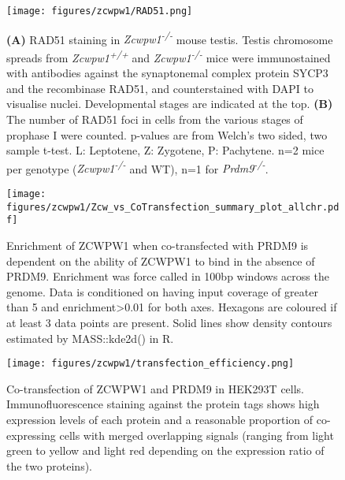 \begin{figure}[H]
	\centering
	\texttt{[image: figures/zcwpw1/RAD51.png]}
	\caption[RAD51 Counts]{
		\textbf{(A)} RAD51 staining in \textit{Zcwpw1\textsuperscript{-/-}} mouse testis. Testis chromosome spreads from \textit{Zcwpw1\textsuperscript{+/+}} and \textit{Zcwpw1\textsuperscript{-/-}} mice were immunostained with antibodies against the synaptonemal complex protein SYCP3 and the recombinase RAD51, and counterstained with DAPI to visualise nuclei. Developmental stages are indicated at the top.
		\textbf{(B)} The number of RAD51 foci in cells from the various stages of prophase I were counted. p-values are from Welch’s two sided, two sample t-test. L: Leptotene, Z: Zygotene, P: Pachytene. n=2 mice per genotype (\textit{Zcwpw1\textsuperscript{-/-}} and WT), n=1 for \textit{Prdm9\textsuperscript{-/-}}.
	}
	\label{fig:Rad51}
\end{figure}


\begin{figure}[H]
	\centering
	\texttt{[image: figures/zcwpw1/Zcw\_vs\_CoTransfection\_summary\_plot\_allchr.pdf]}
	\caption[Zcwpw1 alone vs Co-transfection]{
		Enrichment of ZCWPW1 when co-transfected with PRDM9 is dependent on the ability of ZCWPW1 to bind in the absence of PRDM9. Enrichment was force called in 100bp windows across the genome. Data is conditioned on having input coverage of greater than 5 and enrichment>0.01 for both axes. Hexagons are coloured if at least 3 data points are present. Solid lines show density contours estimated by MASS::kde2d() in R.
	}
	\label{fig:Zcw_vs_cotransfection}
\end{figure}


\begin{figure}[H]
	\centering
	\texttt{[image: figures/zcwpw1/transfection\_efficiency.png]}
	\caption[Transfection Efficiency]{
		Co-transfection of ZCWPW1 and PRDM9 in HEK293T cells. Immunofluorescence staining against the protein tags shows high expression levels of each protein and a reasonable proportion of co-expressing cells with merged overlapping signals (ranging from light green to yellow and light red depending on the expression ratio of the two proteins).
	}
	\label{fig:transfection_efficiency}
\end{figure}


